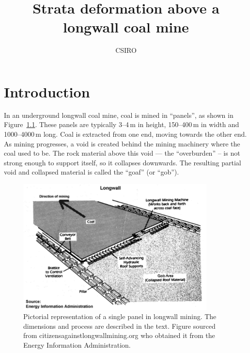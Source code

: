 \documentclass[]{scrreprt}
\begin{document}
\title{Strata deformation above a longwall coal mine}
\author{CSIRO}
\maketitle

\tableofcontents

\chapter{Introduction}

In an underground longwall coal mine, coal is mined in ``panels'', as
shown in Figure~\ref{lw_mining_graphic.fig}.  These panels are typically 3--4\,m in
height, 150--400\,m in width and 1000--4000\,m long.  Coal is
extracted from one end, moving towards the other end.  As mining
progresses, a void is created behind the mining
machinery where the coal used to be.  The rock material above this
void --- the ``overburden'' -- is not strong enough to support itself,
so it collapses downwards.  The resulting partial void and collapsed
material is called the ``goaf'' (or ``gob'').

\begin{figure}[htb]
\begin{center}
\includegraphics[width=10cm]{lw_mining_graphic.pdf}
\caption{Pictorial representation of a single panel in longwall
  mining.  The dimensions and process are described in the text.  Figure sourced from
  citizensagainstlongwallmining.org who obtained it from the Energy
  Information Administration.}
\label{lw_mining_graphic.fig}
\end{center}
\end{figure}
\end{document}
